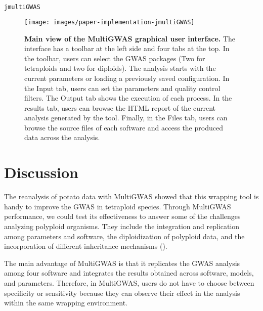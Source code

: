 \documentclass{article}
\begin{document}
\begin{lstlisting}[language=bash,basicstyle={\small}]
jmultiGWAS
\end{lstlisting}

\begin{figure}[H]
\begin{centering}
\texttt{[image: images/paper-implementation-jmultiGWAS]}
\par\end{centering}
\caption{\textbf{Main view of the MultiGWAS graphical user interface.}  The interface has a toolbar at the left side and four tabs at the top. In the toolbar, users can select the GWAS packages (Two for tetraploids and two for diploids). The analysis starts with the current parameters or loading a previously saved configuration. In the Input tab, users can set the parameters and quality control filters. The Output tab shows the execution of each process. In the results tab, users can browse the HTML report of the current analysis generated by the tool. Finally, in the Files tab, users can browse the source files of each software and access the produced data across the analysis.}\label{fig:MultiGWAS-interaction} 
\end{figure}

\section{Discussion}

The reanalysis of potato data with MultiGWAS showed that this wrapping tool is handy to improve the GWAS in tetraploid species. Through MultiGWAS performance, we could test its effectiveness to answer some of the challenges analyzing polyploid organisms. They include the integration and replication among parameters and software, the diploidization of polyploid data, and the incorporation of different inheritance mechanisms (\cite{dufresne2014}). 

The main advantage of MultiGWAS is that it replicates the GWAS analysis among four software and integrates the results obtained across software, models, and parameters. Therefore, in MultiGWAS, users do not have to choose between specificity or sensitivity because they can observe their effect in the analysis within the same wrapping environment.  
\end{document}
